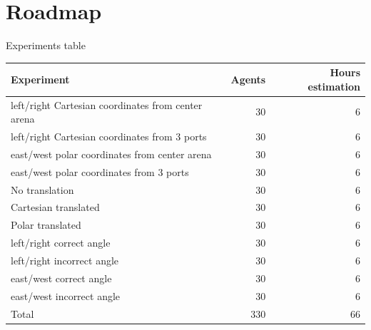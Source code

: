 \documentclass[bigger]{beamer}
\begin{document}
\section{Roadmap }
\label{sec:orgd3cf5fd}
\begin{frame}[label={sec:org817eb6e}]{Experiments table}
\scriptsize
\begin{center}
\begin{tabular}{lrr}
Experiment & Agents & Hours estimation\\
\hline
left/right Cartesian coordinates from center arena & 30 & 6\\
left/right Cartesian coordinates from 3 ports & 30 & 6\\
east/west polar coordinates from center arena & 30 & 6\\
east/west polar coordinates from 3 ports & 30 & 6\\
\hline
No translation & 30 & 6\\
Cartesian translated & 30 & 6\\
Polar translated & 30 & 6\\
left/right correct angle & 30 & 6\\
left/right incorrect angle & 30 & 6\\
east/west correct angle & 30 & 6\\
east/west incorrect angle & 30 & 6\\
\hline
Total & 330 & 66\\
\end{tabular}
\end{center}
\end{frame}
\end{document}
